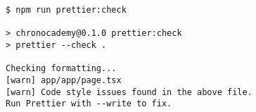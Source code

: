 \begin{verbatim}
$ npm run prettier:check

> chronocademy@0.1.0 prettier:check
> prettier --check .

Checking formatting...
[warn] app/app/page.tsx
[warn] Code style issues found in the above file.
Run Prettier with --write to fix.
\end{verbatim}
